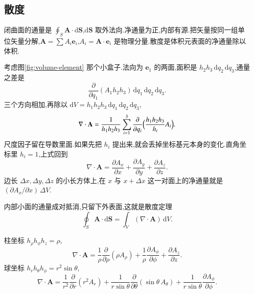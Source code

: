 \subsection{散度}

闭曲面的通量是 $\oint_S\mathbf{A}\cdot\mathrm{d}\mathbf{S}$,$\mathrm{d}\mathbf{S}$ 取外法向.净通量为正,内部有源.把矢量按同一组单位矢量分解,$\mathbf{A}=\sum A_i\mathbf{e}_i$,$A_i=\mathbf{A}\cdot\mathbf{e}_i$ 是物理分量.散度是体积元表面的净通量除以体积.

考虑图\ref{fig:volume-element} 那个小盒子.法向为 $\mathbf{e}_1$ 的两面,面积是 $h_2 h_3\,\mathrm{d}q_2\,\mathrm{d}q_3$,通量之差是
\begin{equation}
  \frac{\partial}{\partial q_1}(A_1 h_2 h_3)\,\mathrm{d}q_1\,\mathrm{d}q_2\,\mathrm{d}q_3.
\end{equation}
三个方向相加,再除以 $\mathrm{d}V=h_1 h_2 h_3\,\mathrm{d}q_1\,\mathrm{d}q_2\,\mathrm{d}q_3$,
\begin{equation}
  \nabla\cdot\mathbf{A}
  =\frac{1}{h_1 h_2 h_3}
    \sum_{i=1}^{3}
    \frac{\partial}{\partial q_i}
    \Bigl(\frac{h_1 h_2 h_3}{h_i} A_i\Bigr).
  \label{eq:div-orthogonal}
\end{equation}
尺度因子留在导数里面.如果先把 $h_i$ 提出来,就会丢掉坐标基元本身的变化.直角坐标里 $h_i=1$,上式回到
\begin{equation}
  \nabla\cdot\mathbf{A}
  =\frac{\partial A_x}{\partial x}
  +\frac{\partial A_y}{\partial y}
  +\frac{\partial A_z}{\partial z}.
\end{equation}
边长 $\Delta x,\Delta y,\Delta z$ 的小长方体上,在 $x$ 与 $x+\Delta x$ 这一对面上的净通量就是 $(\partial A_x/\partial x)\,\Delta V$.

内部小面的通量成对抵消,只留下外表面,这就是散度定理
\begin{equation}
  \oint_S\mathbf{A}\cdot\mathrm{d}\mathbf{S}
  =\int_V(\nabla\cdot\mathbf{A})\,\mathrm{d}V.
  \label{eq:div-theorem}
\end{equation}

柱坐标 $h_{\rho}h_{\phi}h_z=\rho$,
\begin{equation}
  \nabla\cdot\mathbf{A}
  =\frac{1}{\rho}\frac{\partial}{\partial\rho}(\rho A_{\rho})
   +\frac{1}{\rho}\frac{\partial A_{\phi}}{\partial\phi}
   +\frac{\partial A_z}{\partial z}.
  \label{eq:div-cyl}
\end{equation}
球坐标 $h_r h_{\theta} h_{\phi}=r^2\sin\theta$,
\begin{equation}
  \nabla\cdot\mathbf{A}
  =\frac{1}{r^2}\frac{\partial}{\partial r}(r^2 A_r)
   +\frac{1}{r\sin\theta}\frac{\partial}{\partial\theta}(\sin\theta\, A_{\theta})
   +\frac{1}{r\sin\theta}\frac{\partial A_{\phi}}{\partial\phi}.
  \label{eq:div-sph}
\end{equation}

